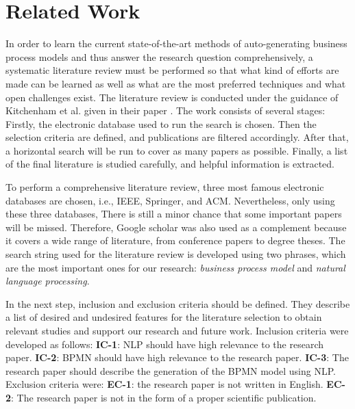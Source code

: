 \chapter{Related Work}
\label{sec:rel}

	In order to learn the current state-of-the-art methods of auto-generating business process models and thus answer the research question comprehensively, a systematic literature review must be performed so that what kind of efforts are made can be learned as well as what are the most preferred techniques and what open challenges exist. The literature review is conducted under the guidance of Kitchenham et al. given in their paper \cite{literature_review_guidance}. The work consists of several stages: Firstly, the electronic database used to run the search is chosen. Then the selection criteria are defined, and publications are filtered accordingly. After that, a horizontal search will be run to cover as many papers as possible. Finally, a list of the final literature is studied carefully, and helpful information is extracted.
	
	To perform a comprehensive literature review, three most famous electronic databases are chosen, i.e., IEEE, Springer, and ACM. Nevertheless, only using these three databases, There is still a minor chance that some important papers will be missed. Therefore, Google scholar was also used as a complement because it covers a wide range of literature, from conference papers to degree theses. The search string used for the literature review is developed using two phrases, which are the most important ones for our research: \textit{business process model} and \textit{natural language processing}.
	
	In the next step, inclusion and exclusion criteria should be defined. They describe a list of desired and undesired features for the literature selection to obtain relevant studies and support our research and future work. Inclusion criteria were developed as follows: \textbf{IC-1}: NLP should have high relevance to the research paper. \textbf{IC-2}: BPMN should have high relevance to the research paper. \textbf{IC-3}: The research paper should describe the generation of the BPMN model using NLP. Exclusion criteria were: \textbf {EC-1}: the research paper is not written in English. \textbf{EC-2}: The research paper is not in the form of a proper scientific publication. 
	
